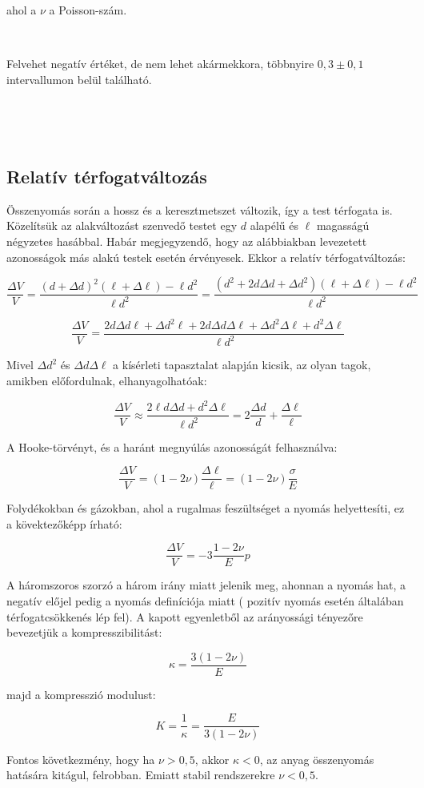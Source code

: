 \documentclass[a4paper, 12pt]{article}
\begin{document}
ahol a $\nu$ a Poisson-szám.

~

Felvehet negatív értéket, de nem lehet akármekkora, többnyire $0,3\pm 0,1$ intervallumon belül található.

~

~

\subsection*{Relatív térfogatváltozás}


Összenyomás során a hossz és a keresztmetszet változik, így a test térfogata is. Közelítsük az alakváltozást szenvedő testet egy $d$ alapélű és $\ell$ magasságú négyzetes hasábbal. Habár megjegyzendő, hogy az alábbiakban levezetett azonosságok más alakú testek esetén érvényesek. Ekkor a relatív térfogatváltozás:

$$\frac{\Delta V}{V}=\frac{(d+\Delta d)^2(\ell+\Delta\ell)-\ell d^2}{\ell d^2}=\frac{(d^2+2d\Delta d+\Delta d^2)(\ell+\Delta\ell)-\ell d^2}{\ell d^2}$$

$$\frac{\Delta V}{V}=\frac{2d\Delta d\ell+\Delta d^2\ell+2d\Delta d\Delta\ell+\Delta d^2\Delta\ell+d^2\Delta\ell}{\ell d^2}$$

Mivel $\Delta d^2$ és $\Delta d\Delta\ell$ a kísérleti tapasztalat alapján kicsik, az olyan tagok, amikben előfordulnak, elhanyagolhatóak:

$$\frac{\Delta V}{V}\approx \frac{2\ell d\Delta d+d^2\Delta\ell}{\ell d^2}=2\frac{\Delta d}{d}+\frac{\Delta\ell}{\ell}$$

A Hooke-törvényt, és a haránt megnyúlás azonosságát felhasználva:

$$\frac{\Delta V}{V}=(1-2\nu)\frac{\Delta\ell}{\ell}=(1-2\nu)\frac{\sigma}{E}$$

Folydékokban és gázokban, ahol a rugalmas feszültséget a nyomás helyettesíti, ez a kövektezőképp írható:

$$\frac{\Delta V}{V}=-3\frac{1-2\nu}{E}p$$

A háromszoros szorzó a három irány miatt jelenik meg, ahonnan a nyomás hat, a negatív előjel pedig a nyomás definíciója miatt ( pozitív nyomás esetén általában térfogatcsökkenés lép fel). A kapott egyenletből az arányossági tényezőre bevezetjük a kompresszibilitást:

$$\kappa=\frac{3(1-2\nu)}{E}$$

majd a kompresszió modulust: 

$$K=\frac{1}{\kappa}=\frac{E}{3(1-2\nu)}$$

Fontos következmény, hogy ha $\nu>0,5$, akkor $\kappa<0$, az anyag összenyomás hatására kitágul, felrobban. Emiatt stabil rendszerekre $\nu<0,5$.
\end{document}
